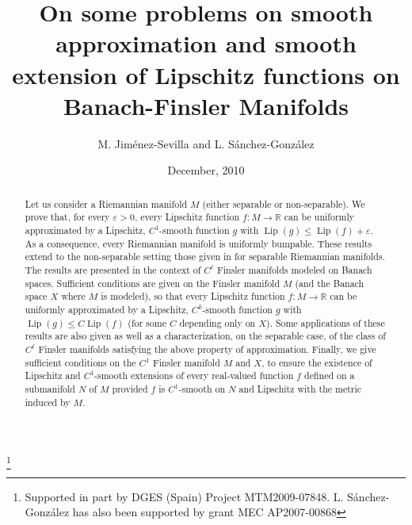 \documentclass[11pt]{amsart}
\numberwithin{equation}{section}
\begin{document}
\title[Approximation and Extension on Banach manifolds]{On some problems on smooth approximation and smooth extension
of Lipschitz functions on Banach-Finsler Manifolds}

\author{M. Jim{\'e}nez-Sevilla and L. S\'anchez-Gonz\'alez}

\address{Departamento de An{\'a}lisis Matem{\'a}tico\\ Facultad de
Matem{\'a}ticas\\ Universidad Complutense\\ 28040 Madrid, Spain}

\thanks{Supported in part by DGES (Spain) Project MTM2009-07848. L. S\'anchez-Gonz\'alez has  also been supported by grant MEC AP2007-00868}




\date{December, 2010}

\maketitle

\begin{abstract}
Let us consider a Riemannian manifold $M$ (either separable or non-separable). We prove  that, for  every $\varepsilon>0$,
every  Lipschitz function  $f:M\rightarrow \mathbb R$ can be uniformly approximated  by a Lipschitz, $C^1$-smooth function $g$ with ${\operatorname{Lip}}(g)\le  {\operatorname{Lip}}(f)+\varepsilon$.  As a consequence, every Riemannian  manifold is uniformly bumpable. These  results  extend  to the non-separable setting those given  in \cite{AzFeMeRa} for separable Riemannian manifolds.
The results are presented in the context of $C^\ell$ Finsler manifolds modeled on Banach spaces. Sufficient conditions are given
on the Finsler manifold $M$ (and the Banach space $X$ where $M$  is modeled), so that every Lipschitz function  $f:M\rightarrow \mathbb R$ can be uniformly approximated by a Lipschitz, $C^k$-smooth function $g$ with ${\operatorname{Lip}}(g)\le C {\operatorname{Lip}}(f)$ (for some $C$ depending only on $X$). Some applications of these results are also given as well as a characterization, on the separable case, of the class of $C^\ell$ Finsler manifolds satisfying the above property of approximation. Finally, we  give  sufficient conditions on the  $C^1$ Finsler manifold $M$ and $X$, to ensure the existence of Lipschitz and $C^1$-smooth extensions
of every real-valued function $f$ defined on a submanifold $N$ of  $M$ provided $f$ is $C^1$-smooth on $N$ and Lipschitz with the
metric induced by $M$. 
\end{abstract}
\end{document}
